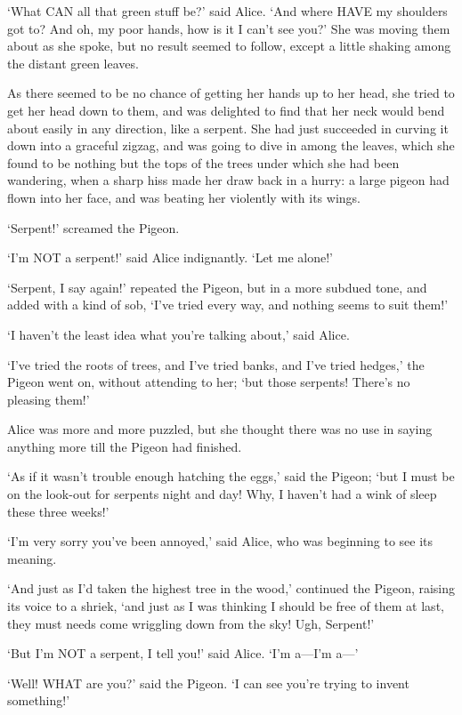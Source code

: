 \documentclass[12pt]{article}
\begin{document}
\begin{Parallel}[p]{}{}
{‘What CAN all that green stuff be?’ said Alice. ‘And where HAVE my shoulders got to? And oh, my poor hands, how is it I can’t see you?’ She was moving them about as she spoke, but no result seemed to follow, except a little shaking among the distant green leaves.

As there seemed to be no chance of getting her hands up to her head, she tried to get her head down to them, and was delighted to find that her neck would bend about easily in any direction, like a serpent. She had just succeeded in curving it down into a graceful zigzag, and was going to dive in among the leaves, which she found to be nothing but the tops of the trees under which she had been wandering, when a sharp hiss made her draw back in a hurry: a large pigeon had flown into her face, and was beating her violently with its wings.

‘Serpent!’ screamed the Pigeon.

‘I’m NOT a serpent!’ said Alice indignantly. ‘Let me alone!’

‘Serpent, I say again!’ repeated the Pigeon, but in a more subdued tone, and added with a kind of sob, ‘I’ve tried every way, and nothing seems to suit them!’

‘I haven’t the least idea what you’re talking about,’ said Alice.

‘I’ve tried the roots of trees, and I’ve tried banks, and I’ve tried hedges,’ the Pigeon went on, without attending to her; ‘but those serpents! There’s no pleasing them!’

Alice was more and more puzzled, but she thought there was no use in saying anything more till the Pigeon had finished.

‘As if it wasn’t trouble enough hatching the eggs,’ said the Pigeon; ‘but I must be on the look-out for serpents night and day! Why, I haven’t had a wink of sleep these three weeks!’

‘I’m very sorry you’ve been annoyed,’ said Alice, who was beginning to see its meaning.

‘And just as I’d taken the highest tree in the wood,’ continued the Pigeon, raising its voice to a shriek, ‘and just as I was thinking I should be free of them at last, they must needs come wriggling down from the sky! Ugh, Serpent!’

‘But I’m NOT a serpent, I tell you!’ said Alice. ‘I’m a—I’m a—’

‘Well! WHAT are you?’ said the Pigeon. ‘I can see you’re trying to invent something!’

}
\end{Parallel}
\end{document}
